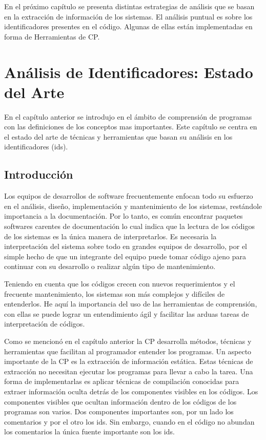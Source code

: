 \documentclass[a4paper,12pt]{report}
\begin{document}
En el próximo capítulo se presenta distintas estrategias de análisis que se basan en la extracción de información de los sistemas. El análisis puntual es sobre los identificadores presentes en el código. Algunas de ellas están implementadas en forma de Herramientas de CP.




\chapter{Análisis de Identificadores: Estado del Arte}


En el capítulo anterior se introdujo en el ámbito de comprensión de programas con las definiciones de los conceptos mas importantes. Este capítulo se centra en el estado del arte de técnicas y herramientas que basan su análisis en los identificadores (ids).

\section{Introducción}

Los equipos de desarrollos de software frecuentemente enfocan todo su esfuerzo en el análisis, diseño, implementación y mantenimiento de los sistemas, restándole importancia a la documentación. Por lo tanto, es común encontrar paquetes softwares carentes de documentación lo cual indica que la lectura de los códigos de los sistemas es la única manera de interpretarlos. Es necesaria la interpretación del sistema sobre todo en grandes equipos de desarrollo, por el simple hecho de que un integrante del equipo puede tomar código ajeno para continuar con su desarrollo o realizar algún tipo de mantenimiento.

Teniendo en cuenta que los códigos crecen con nuevos requerimientos y el frecuente mantenimiento, los sistemas son más complejos y difíciles de entenderlos. He aquí la importancia del uso de las herramientas de comprensión, con ellas se puede lograr un entendimiento ágil y facilitar las arduas tareas de interpretación de códigos.

Como se mencionó en el capítulo anterior la CP desarrolla métodos, técnicas y herramientas que facilitan al programador entender los programas. Un aspecto importante de la CP es la extracción de información estática. Estas técnicas de extracción no necesitan ejecutar los programas para llevar a cabo la tarea. Una forma de implementarlas es aplicar técnicas de compilación conocidas para extraer información oculta detrás de los componentes visibles en los códigos.
Los componentes visibles que ocultan información dentro de los códigos de los programas son varios. Dos componentes importantes son, por un lado los comentarios y por el otro los ids. Sin embargo, cuando en el código no abundan los comentarios la única fuente importante son los ids.
\end{document}

